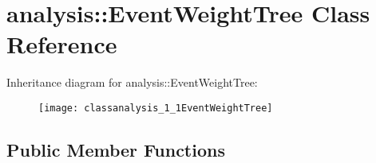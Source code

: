 \hypertarget{classanalysis_1_1EventWeightTree}{\section{analysis\-:\-:Event\-Weight\-Tree Class Reference}
\label{classanalysis_1_1EventWeightTree}
}
Inheritance diagram for analysis\-:\-:Event\-Weight\-Tree\-:\begin{figure}[H]
\begin{center}
\leavevmode
\texttt{[image: classanalysis\_1\_1EventWeightTree]}
\end{center}
\end{figure}
\subsection*{Public Member Functions}

